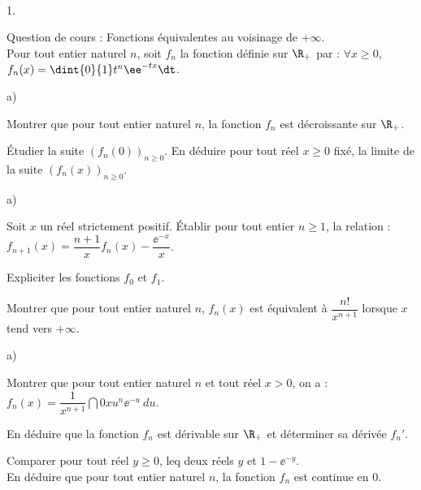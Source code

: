 \documentclass[11pt]{article}%
\begin{document}
\newpage


\begin{exerciceAP}~
  \begin{noliste}{1.}
    \setlength{\itemsep}{2mm}
  \item Question de cours : Fonctions équivalentes au voisinage de $+\infty$.\\
    Pour tout entier naturel $n$, soit $f_n$ la fonction définie sur
    $\R_+$ par : $\forall x \geq 0$, $f_n(x)=\dint{0}{1} t^n \ee^{-tx}
    \dt$.
  \item
    \begin{noliste}{a)}
    \setlength{\itemsep}{2mm}
    \item Montrer que pour tout entier naturel $n$, la fonction $f_n$
      est décroissante sur $\R_+$.
    \item Étudier la suite $(f_n(0))_{n\geq 0}$. En déduire pour
      tout réel $x\geq 0$ fixé, la limite de la suite $(f_n(x))_{n\geq
        0}$.
    \end{noliste}
  \item
    \begin{noliste}{a)}
    \setlength{\itemsep}{2mm}
    \item Soit $x$ un réel strictement positif. Établir pour tout
      entier $n\geq 1$, la relation :
      $f_{n+1}(x)=\dfrac{n+1}{x}f_n(x)-\dfrac{\ee^{-x}}{x}$.
    \item Expliciter les fonctions $f_0$ et $f_1$.
    \item Montrer que pour tout entier naturel $n$, $f_n(x)$ est
      équivalent à $\dfrac{n!}{x^{n+1}}$ lorsque $x$ tend vers
      $+\infty$.
    \end{noliste}
  \item
    \begin{noliste}{a)}
    \setlength{\itemsep}{2mm}
    \item Montrer que pour tout entier naturel $n$ et tout réel $x>0$,
      on a : $f_n(x)=\dfrac{1}{x^{n+1}}\dint{0}{x} u^n \ee^{-u} \ du$.
    \item En déduire que la fonction $f_n$ est dérivable sur $\R_+$ et
      déterminer sa dérivée $f_n'$.
    \item Comparer pour tout réel $y\geq 0$, leq deux réels $y$ et
      $1-\ee^{-y}$.\\
      En déduire que pour tout entier naturel $n$, la fonction $f_n$
      est continue en $0$.
    \end{noliste}
  \end{noliste}
\end{exerciceAP}
\end{document}
